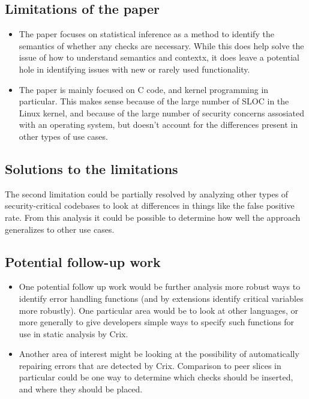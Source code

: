\documentclass[11pt]{article}
\begin{document}
\subsection*{Limitations of the paper}
\begin{itemize}
\item The paper focuses on statistical inference as a method to identify the semantics of whether any checks are necessary. While this does help solve the issue of how to understand semantics and contextx, it does leave a potential hole in identifying issues with new or rarely used functionality.
\item The paper is mainly focused on C code, and kernel programming in particular. This makes sense because of the large number of SLOC in the Linux kernel, and because of the large number of security concerns assosiated with an operating system, but doesn't account for the differences present in other types of use cases.
\end{itemize}

\subsection*{Solutions to the limitations}

The second limitation could be partially resolved by analyzing other types of security-critical codebases to look at differences in things like the false positive rate. From this analysis it could be possible to determine how well the approach generalizes to other use cases. 

\subsection*{Potential follow-up work}
\begin{itemize}
\item One potential follow up work would be further analysis more robust ways to identify error handling functions (and by extensions identify critical variables more robustly). One particular area would be to look at other languages, or more generally to give developers simple ways to specify such functions for use in static analysis by Crix.
\item Another area of interest might be looking at the possibility of automatically repairing errors that are detected by Crix. Comparison to peer slices in particular could be one way to determine which checks should be inserted, and where they should be placed.

\end{itemize}
\end{document}
